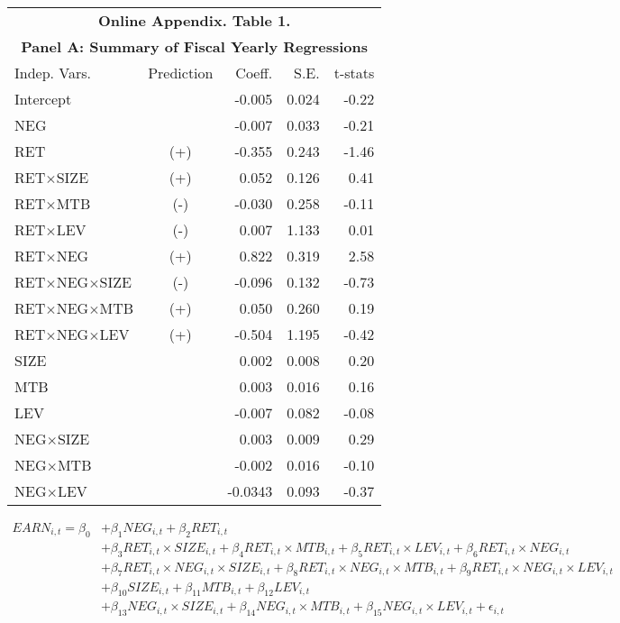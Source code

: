 \begin{table}[h] \label{OAT1}
  \begin{center}
  	    \begin{tabular}{lcrrr}
  		\multicolumn{5}{c}{\textbf{Online Appendix. Table 1.}} \\
  		\multicolumn{5}{c}{\textbf{Panel A: Summary of Fiscal Yearly Regressions}} \\
  		\midrule
  		\midrule
  		Indep. Vars. & Prediction & Coeff. & S.E. & t-stats \\
  		\midrule
  		Intercept &   & -0.005 & 0.024 & -0.22 \\
  		NEG &   & -0.007 & 0.033 & -0.21 \\
  		RET & (+) & -0.355 & 0.243 & -1.46 \\
  		RET$\times$SIZE & (+) & 0.052 & 0.126 & 0.41 \\
  		RET$\times$MTB & (-) & -0.030 & 0.258 & -0.11 \\
  		RET$\times$LEV & (-) & 0.007 & 1.133 & 0.01 \\
  		RET$\times$NEG & (+) & 0.822 & 0.319 & 2.58 \\
  		RET$\times$NEG$\times$SIZE & (-) & -0.096 & 0.132 & -0.73 \\
  		RET$\times$NEG$\times$MTB & (+) & 0.050 & 0.260 & 0.19 \\
  		RET$\times$NEG$\times$LEV & (+) & -0.504 & 1.195 & -0.42 \\
  		SIZE &   & 0.002 & 0.008 & 0.20 \\
  		MTB &   & 0.003 & 0.016 & 0.16 \\
  		LEV &   & -0.007 & 0.082 & -0.08 \\
  		NEG$\times$SIZE &   & 0.003 & 0.009 & 0.29 \\
  		NEG$\times$MTB &   & -0.002 & 0.016 & -0.10 \\
  		NEG$\times$LEV &   & -0.0343 & 0.093 & -0.37 \\
  		\bottomrule
  		\bottomrule
  	\end{tabular}%
  \end{center}
\begin{footnotesize}
	\setcounter{equation}{2}
	\begin{equation}
		\begin{split}
			EARN_{i,t} = \beta_0&+\beta_1NEG_{i,t}+\beta_2RET_{i,t}\\
			&+\beta_3RET_{i,t}\times SIZE_{i,t}+\beta_4RET_{i,t}\times MTB_{i,t}+\beta_5RET_{i,t}\times LEV_{i,t}+\beta_6RET_{i,t}\times NEG_{i,t}\\
			&+\beta_7RET_{i,t}\times NEG_{i,t}\times SIZE_{i,t}+\beta_8RET_{i,t}\times NEG_{i,t}\times MTB_{i,t}+\beta_9RET_{i,t}\times NEG_{i,t}\times 	LEV_{i,t}\\
			&+\beta_{10}SIZE_{i,t}+\beta_{11}MTB_{i,t}+\beta_{12}LEV_{i,t}\\
			&+\beta_{13}NEG_{i,t}\times SIZE_{i,t}+\beta_{14}NEG_{i,t}\times MTB_{i,t}+\beta_{15}NEG_{i,t}\times LEV_{i,t}+ \epsilon_{i,t}
		\end{split}
	\end{equation}
	

\end{footnotesize}
\end{table}
